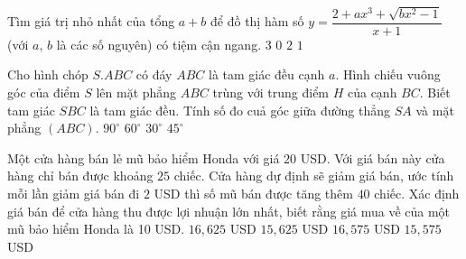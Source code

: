 \begin{ex}%
Tìm giá trị nhỏ nhất của tổng  $a+b$ để đồ thị hàm số $y=\dfrac{2+ax^3+\sqrt{bx^2-1}}{x+1}$ (với $a$, $b$ là các số nguyên) có tiệm cận ngang.
\choice
{$3$}
{$0$}
{$2$}
{\True $1$}
\end{ex}

\begin{ex}%
Cho hình chóp $S.ABC$ có đáy $ABC$ là tam giác đều cạnh $a$. Hình chiếu vuông góc của điểm $S$ lên mặt phẳng $ABC$ trùng với trung điểm $H$ của cạnh $BC$. Biết tam giác $SBC$ là tam giác đều. Tính số đo cuả góc giữa đường thẳng $SA$ và mặt phẳng $(ABC)$.
\choice
{$90^{\circ}$}
{$60^{\circ}$}
{$30^{\circ}$}
{\True $45^{\circ}$}
\end{ex}

\begin{ex}%
Một cửa hàng bán lẻ mũ bảo hiểm Honda với giá $20$ USD. Với giá bán này cửa hàng chỉ bán được khoảng $25$ chiếc. Cửa hàng dự định sẽ giảm giá bán, ước tính mỗi  lần giảm giá bán đi $2$ USD thì số mũ bán được tăng thêm $40$ chiếc. Xác định giá bán để cửa hàng thu được lợi nhuận lớn nhất, biết rằng giá mua về của một mũ bảo hiểm Honda là 10 USD. 
\choice
{$16,625$ USD}
{\True $15,625$ USD}
{$16,575$ USD}
{$15,575$ USD}
\end{ex}

